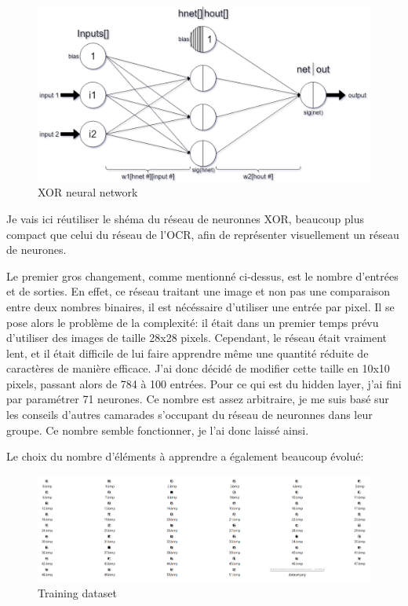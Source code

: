 \documentclass[12pt]{report}
\begin{document}
\begin{figure}[H]
    \centering
    \includegraphics[width=1\textwidth]{XOR_Neural_Network}
    \caption{XOR neural network}
\end{figure}

Je vais ici réutiliser le shéma du réseau de neuronnes XOR, beaucoup plus compact que celui du réseau de l'OCR, afin de représenter visuellement un réseau de neurones.

\newpage

Le premier gros changement, comme mentionné ci-dessus, est le nombre d'entrées et de sorties. En effet, ce réseau traitant une image et non pas une comparaison entre deux nombres binaires, il est nécéssaire d'utiliser une entrée par pixel. Il se pose alors le problème de la complexité: il était dans un premier temps prévu d'utiliser des images de taille 28x28 pixels. Cependant, le réseau était vraiment lent, et il était difficile de lui faire apprendre même une quantité réduite de caractères de manière efficace. J'ai donc décidé de modifier cette taille en 10x10 pixels, passant alors de 784 à 100 entrées. Pour ce qui est du hidden layer, j'ai fini par paramétrer 71 neurones. Ce nombre est assez arbitraire, je me suis basé sur les conseils d'autres camarades s'occupant du réseau de neuronnes dans leur groupe. Ce nombre semble fonctionner, je l'ai donc laissé ainsi.

Le choix du nombre d'éléments à apprendre a également beaucoup évolué:

\begin{figure}[H]
    \centering
    \includegraphics[width=1\textwidth]{dataset}
    \caption{Training dataset}
\end{figure}
\end{document}
